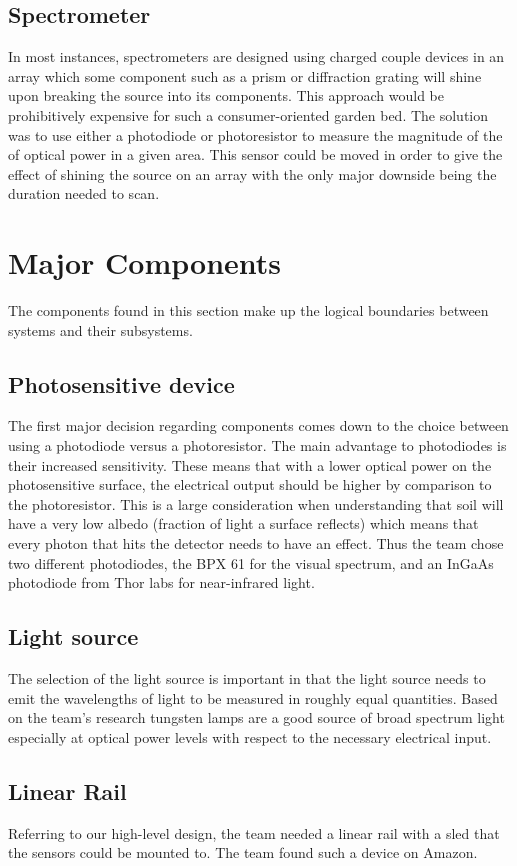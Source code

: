 \documentclass[journal]{IEEEtran}
\begin{document}
\subsection{Spectrometer} 
In most instances, spectrometers are designed using charged couple devices in an array which some
component such as a prism or diffraction grating will shine upon breaking the source into its
components. This approach would be prohibitively expensive for such a consumer-oriented garden
bed. The solution was to use either a photodiode or photoresistor to measure the magnitude of the
of optical power in a given area. This sensor could be moved in order to give the effect of shining
the source on an array with the only major downside being the duration needed to scan. 
\section{Major Components} \label{sec:major-components}
The components found in this section make up the logical boundaries between systems and their
subsystems.
\subsection{Photosensitive device}
The first major decision regarding components comes down to the choice between using a photodiode versus
a photoresistor. The main advantage to photodiodes is their increased sensitivity. These means that with a lower
optical power on the photosensitive surface, the electrical output should be higher by comparison to the photoresistor.
This is a large consideration when understanding that soil will have a very low albedo (fraction of light a surface reflects)
which means that every photon that hits the detector needs to have an effect.
Thus the team chose two different photodiodes, the BPX 61 for the visual spectrum, and an InGaAs photodiode from Thor labs
for near-infrared light.
\subsection{Light source}
The selection of the light source is important in that the light source needs to emit the wavelengths
of light to be measured in roughly equal quantities. Based on the team's research tungsten lamps are a good source
of broad spectrum light especially at optical power levels with respect to the necessary electrical input.
\subsection{Linear Rail}
Referring to our high-level design, the team needed a linear rail with a sled that the sensors could be mounted to.
The team found such a device on Amazon.
\end{document}
